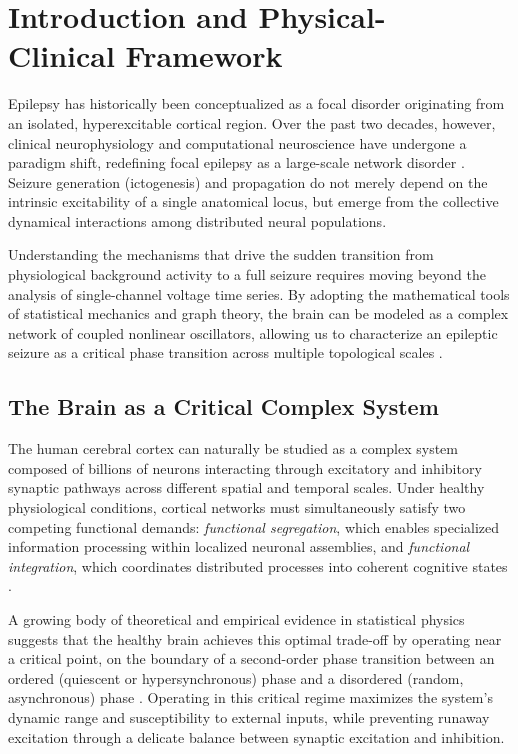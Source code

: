 \chapter[Introduction and Physical-Clinical Framework]{Introduction and Physical-\\Clinical Framework}
\label{chap:introduction}

Epilepsy has historically been conceptualized as a focal disorder originating from an isolated, hyperexcitable cortical region. Over the past two decades, however, clinical neurophysiology and computational neuroscience have undergone a paradigm shift, redefining focal epilepsy as a large-scale network disorder \cite{bartolomei2001dynamical, kramer2010coalescence}. Seizure generation (ictogenesis) and propagation do not merely depend on the intrinsic excitability of a single anatomical locus, but emerge from the collective dynamical interactions among distributed neural populations.

Understanding the mechanisms that drive the sudden transition from physiological background activity to a full seizure requires moving beyond the analysis of single-channel voltage time series. By adopting the mathematical tools of statistical mechanics and graph theory, the brain can be modeled as a complex network of coupled nonlinear oscillators, allowing us to characterize an epileptic seizure as a critical phase transition across multiple topological scales \cite{newman2018networks, bullmore2009complex}.

\section{The Brain as a Critical Complex System}
\label{sec:brain_critical_system}

The human cerebral cortex can naturally be studied as a complex system composed of billions of neurons interacting through excitatory and inhibitory synaptic pathways across different spatial and temporal scales. Under healthy physiological conditions, cortical networks must simultaneously satisfy two competing functional demands: \textit{functional segregation}, which enables specialized information processing within localized neuronal assemblies, and \textit{functional integration}, which coordinates distributed processes into coherent cognitive states \cite{bullmore2009complex}.

A growing body of theoretical and empirical evidence in statistical physics suggests that the healthy brain achieves this optimal trade-off by operating near a critical point, on the boundary of a second-order phase transition between an ordered (quiescent or hypersynchronous) phase and a disordered (random, asynchronous) phase \cite{chialvo2010emergent, beggs2003neuronal}. Operating in this critical regime maximizes the system's dynamic range and susceptibility to external inputs, while preventing runaway excitation through a delicate balance between synaptic excitation and inhibition.

